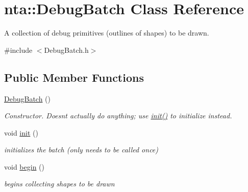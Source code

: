 \hypertarget{classnta_1_1DebugBatch}{}\section{nta\+:\+:Debug\+Batch Class Reference}
\label{classnta_1_1DebugBatch}


A collection of debug primitives (outlines of shapes) to be drawn.  




{\ttfamily \#include $<$Debug\+Batch.\+h$>$}

\subsection*{Public Member Functions}
\begin{DoxyCompactItemize}
\item 
\mbox{\label{classnta_1_1DebugBatch_ab546a069bab54be8d89a3937f418292e}} 
\hyperlink{classnta_1_1DebugBatch_ab546a069bab54be8d89a3937f418292e}{Debug\+Batch} ()
\begin{DoxyCompactList}\small\item\em Constructor. Doesn\textquotesingle{}t actually do anything; use \hyperlink{classnta_1_1DebugBatch_a9d60f69ba86c7267e69984cc29e1f53c}{init()} to initialize instead. \end{DoxyCompactList}\item 
\mbox{\label{classnta_1_1DebugBatch_a9d60f69ba86c7267e69984cc29e1f53c}} 
void \hyperlink{classnta_1_1DebugBatch_a9d60f69ba86c7267e69984cc29e1f53c}{init} ()
\begin{DoxyCompactList}\small\item\em initializes the batch (only needs to be called once) \end{DoxyCompactList}\item 
\mbox{\label{classnta_1_1DebugBatch_a183ea86f6636aef3aeae66a0eb8aec5a}} 
void \hyperlink{classnta_1_1DebugBatch_a183ea86f6636aef3aeae66a0eb8aec5a}{begin} ()
\begin{DoxyCompactList}\small\item\em begins collecting shapes to be drawn \end{DoxyCompactList}\item 
\mbox{\label{classnta_1_1DebugBatch_abc2f517c6dd1fb4a65624335d11c92f1}} 

\end{DoxyCompactItemize}
